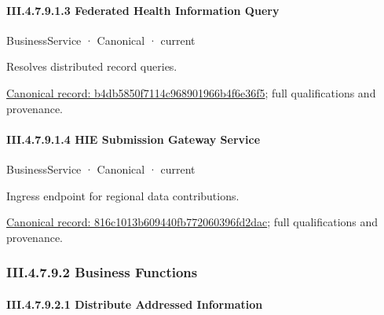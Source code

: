 \paragraph*{III.4.7.9.1.3 Federated Health Information Query}
\label{navigation:III.4.7.9.1.3}

\label{element:b4db5850f7114c968901966b4f6e36f5}
{\small BusinessService · Canonical · current}\par

Resolves distributed record queries.


{\footnotesize \href{../../../../../../../continuum/business/business-service/b4db5850f7114c968901966b4f6e36f5.md}{Canonical record: b4db5850f7114c968901966b4f6e36f5}; full qualifications and provenance.}\par
\paragraph*{III.4.7.9.1.4 HIE Submission Gateway Service}
\label{navigation:III.4.7.9.1.4}

\label{element:816c1013b609440fb772060396fd2dac}
{\small BusinessService · Canonical · current}\par

Ingress endpoint for regional data contributions.


{\footnotesize \href{../../../../../../../continuum/business/business-service/816c1013b609440fb772060396fd2dac.md}{Canonical record: 816c1013b609440fb772060396fd2dac}; full qualifications and provenance.}\par
\subsubsection*{III.4.7.9.2 Business Functions}
\label{navigation:III.4.7.9.2}

\paragraph*{III.4.7.9.2.1 Distribute Addressed Information}
\label{navigation:III.4.7.9.2.1}

